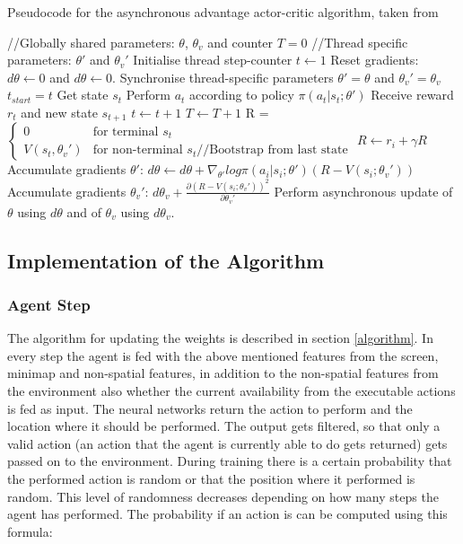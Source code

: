 \documentclass{article}
\begin{document}
\begin{algorithm}
\caption{Pseudocode for the asynchronous advantage actor-critic algorithm, 
taken from \cite{Mnih2016}}
\label{pseudocode}
\begin{algorithmic}
\State //Globally shared parameters: $\theta$, $\theta_v$ and counter $T = 0$
\State //Thread specific parameters: $\theta'$ and $\theta_v'$
\State Initialise thread step-counter $t \gets 1$
\Repeat
\State Reset gradients: $d\theta \gets 0$ and $d\theta \gets 0$.
\State Synchronise thread-specific parameters $\theta' = \theta$ and $\theta_v' 
= \theta_v$ 
\State $t_{start} = t$ 
\State Get state $s_t$ 
\Repeat
\State Perform $a_t$ according to policy $\pi(a_t | s_t; \theta')$
\State Receive reward $r_t$ and new state $s_{t+1}$
\State $t \gets t+1$
\State $T \gets T+1$
\State R = $\begin{cases} 0 & \text{for terminal }s_t \\ V(s_t, \theta_v') & 
    \text{for non-terminal } s_t \text{//Bootstrap from last state} \end{cases}$
\State $R \gets r_i + \gamma R$
\State Accumulate gradients $\theta'$: $d\theta \gets d\theta + 
    \nabla_{\theta'} log \pi(a_i | s_i; \theta') (R - V(s_i; \theta_v'))$
\State Accumulate gradients $\theta_v'$: $d\theta_v + \frac{\partial (R - 
    V(s_i; \theta_v'))^2}{\partial \theta_v'}$
\EndFor
\State Perform asynchronous update of $\theta$ using $d\theta$ and of 
    $\theta_v$ using $d\theta_v$.
\end{algorithmic}
\end{algorithm}


\subsection{Implementation of the Algorithm}
\subsubsection{Agent Step}
The algorithm for updating the weights is described in section \ref{algorithm}. 
In every step the agent is fed with the above mentioned features from the 
screen, minimap and non-spatial features, in addition to the non-spatial 
features from the environment also whether the current availability from the 
executable actions is fed as input. The neural networks return the action to 
perform and the location where it should be performed. The output gets 
filtered, so that only a valid action (an action that the agent is currently 
able to do gets returned) gets passed on to the environment. During training 
there is a certain probability that the performed action is random or that the 
position where it performed is random. This level of randomness decreases 
depending on how many steps the agent has performed. The probability if an 
action is can be computed using this formula: 
\end{document}
